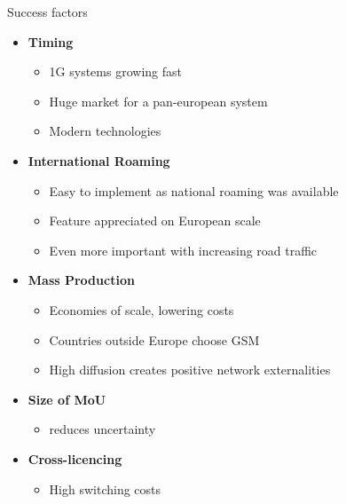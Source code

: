 \begin{frame}{Success factors}
  \begin{itemize}
    \item \textbf{Timing}
    \begin{itemize}
      \item 1G systems growing fast
      \item Huge market for a pan-european system
      \item Modern technologies 
    \end{itemize}
    \item \textbf{International Roaming}
    \begin{itemize}
      \item Easy to implement as national roaming was available
      \item Feature appreciated on European scale
      \item Even more important with increasing road traffic 
    \end{itemize}
    \item \textbf{Mass Production}
    \begin{itemize}
      \item Economies of scale, lowering costs
      \item Countries outside Europe choose GSM
      \item High diffusion creates positive network externalities
    \end{itemize}
    \item \textbf{Size of MoU}
    \begin{itemize}
      \item reduces uncertainty
    \end{itemize}
    \item \textbf{Cross-licencing}
    \begin{itemize}
      \item High switching costs 
    \end{itemize} 
  \end{itemize}
\end{frame}

